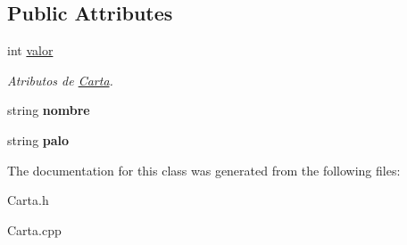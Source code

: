 \subsection*{Public Attributes}
\begin{DoxyCompactItemize}
\item 
\hypertarget{class_carta_a40ed698935c3b770a0b118dea14c667b}{int \hyperlink{class_carta_a40ed698935c3b770a0b118dea14c667b}{valor}}\label{class_carta_a40ed698935c3b770a0b118dea14c667b}

\begin{DoxyCompactList}\small\item\em Atributos de \hyperlink{class_carta}{Carta}. \end{DoxyCompactList}\item 
\hypertarget{class_carta_af9ecddff3f4ac2ffe4a00a5ec62a3b29}{string {\bfseries nombre}}\label{class_carta_af9ecddff3f4ac2ffe4a00a5ec62a3b29}

\item 
\hypertarget{class_carta_a708b56ce311c1ea2329a76c60d740881}{string {\bfseries palo}}\label{class_carta_a708b56ce311c1ea2329a76c60d740881}

\end{DoxyCompactItemize}


The documentation for this class was generated from the following files\+:\begin{DoxyCompactItemize}
\item 
Carta.\+h\item 
Carta.\+cpp\end{DoxyCompactItemize}
